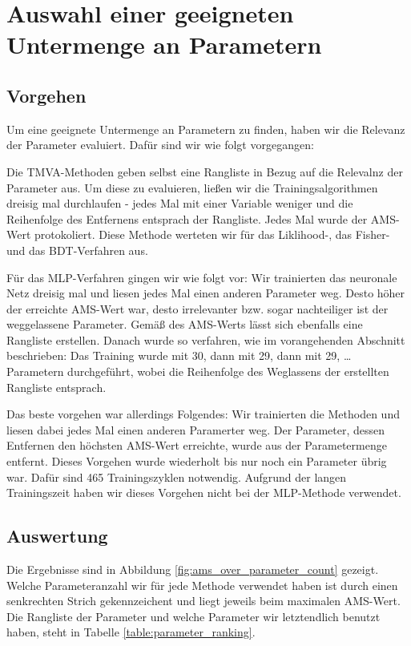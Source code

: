 \section{Auswahl einer geeigneten Untermenge an Parametern}

\subsection{Vorgehen}
Um eine geeignete Untermenge an Parametern zu finden, haben wir die Relevanz der
Parameter evaluiert. Dafür sind wir wie folgt vorgegangen:

Die TMVA-Methoden geben selbst eine Rangliste in Bezug auf die Relevalnz der
Parameter aus. Um diese zu evaluieren, ließen wir die Trainingsalgorithmen
dreisig mal durchlaufen - jedes Mal mit einer Variable weniger und die
Reihenfolge des Entfernens entsprach der Rangliste. Jedes Mal wurde der AMS-Wert
protokoliert. Diese Methode werteten wir für das Liklihood-, das Fisher- und das
BDT-Verfahren aus.

Für das MLP-Verfahren gingen wir wie folgt vor: Wir trainierten das neuronale
Netz dreisig mal und liesen jedes Mal einen anderen Parameter weg. Desto höher
der erreichte AMS-Wert war, desto irrelevanter bzw. sogar nachteiliger ist der
weggelassene Parameter. Gemäß des AMS-Werts lässt sich ebenfalls eine Rangliste
erstellen. Danach wurde so verfahren, wie im vorangehenden Abschnitt
beschrieben: Das Training wurde mit 30, dann mit 29, dann mit 29, \ldots
Parametern durchgeführt, wobei die Reihenfolge des Weglassens der erstellten
Rangliste entsprach.

Das beste vorgehen war allerdings Folgendes: Wir trainierten die Methoden
und liesen dabei jedes Mal einen anderen Paramerter weg. Der Parameter, dessen
Entfernen den höchsten AMS-Wert erreichte, wurde aus der Parametermenge
entfernt.
Dieses Vorgehen wurde wiederholt bis nur noch ein Parameter übrig war. Dafür
sind 465 Trainingszyklen notwendig. Aufgrund der langen Trainingszeit
haben wir dieses Vorgehen nicht bei der MLP-Methode verwendet.


\subsection{Auswertung}

Die Ergebnisse sind in Abbildung \ref{fig:ams_over_parameter_count} gezeigt.
Welche Parameteranzahl wir für jede Methode verwendet haben ist durch einen
senkrechten Strich gekennzeichent und liegt jeweils beim maximalen AMS-Wert.
Die Rangliste der Parameter und welche Parameter wir letztendlich benutzt haben,
steht in Tabelle \ref{table:parameter_ranking}.

